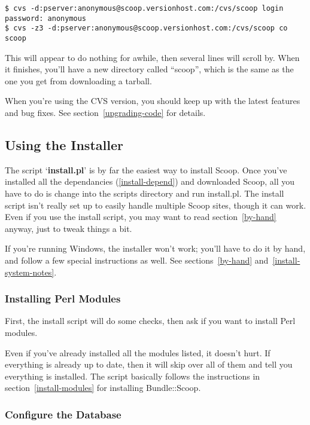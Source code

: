 \begin{verbatim}
$ cvs -d:pserver:anonymous@scoop.versionhost.com:/cvs/scoop login
password: anonymous
$ cvs -z3 -d:pserver:anonymous@scoop.versionhost.com:/cvs/scoop co scoop
\end{verbatim}

This will appear to do nothing for awhile, then several lines will scroll by. When it finishes, you'll have a new directory called ``scoop'', which is the same as the one you get from downloading a tarball.

When you're using the CVS version, you should keep up with the latest features and bug fixes.  See section~\ref{upgrading-code} for details.

\subsection{Using the Installer}

The script `{\bf install.pl}' is by far the easiest way to install Scoop.  Once you've installed all the dependancies (\ref{install-depend}) and downloaded Scoop, all you have to do is change into the scripts directory and run install.pl.  The install script isn't really set up to easily handle multiple Scoop sites, though it can work.  Even if you use the install script, you may want to read section~\ref{by-hand} anyway, just to tweak things a bit.

If you're running Windows, the installer won't work; you'll have to do it by hand, and follow a few special instructions as well.  See sections~\ref{by-hand} and~\ref{install-system-notes}.

\subsubsection{Installing Perl Modules}

First, the install script will do some checks, then ask if you want to install Perl modules. 

Even if you've already installed all the modules listed, it doesn't hurt. If everything is already up to date, then it will skip over all of them and tell you everything is installed.  The script basically follows the instructions in section~\ref{install-modules} for installing Bundle::Scoop.

\subsubsection{Configure the Database}

